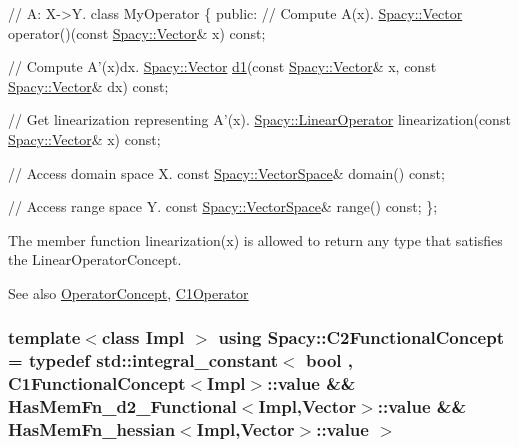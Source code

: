 \begin{DoxyCode}
\textcolor{comment}{// A: X->Y.}
\textcolor{keyword}{class }MyOperator
\{
\textcolor{keyword}{public}:
  \textcolor{comment}{// Compute A(x).}
  \hyperlink{classSpacy_1_1Vector}{Spacy::Vector} operator()(\textcolor{keyword}{const} \hyperlink{classSpacy_1_1Vector}{Spacy::Vector}& x) \textcolor{keyword}{const};

  \textcolor{comment}{// Compute A'(x)dx.}
  \hyperlink{classSpacy_1_1Vector}{Spacy::Vector} \hyperlink{namespaceSpacy_ab6646eb7068eb9f1369e639cf0b620a2}{d1}(\textcolor{keyword}{const} \hyperlink{classSpacy_1_1Vector}{Spacy::Vector}& x, \textcolor{keyword}{const} 
      \hyperlink{classSpacy_1_1Vector}{Spacy::Vector}& dx) \textcolor{keyword}{const};

  \textcolor{comment}{// Get linearization representing A'(x).}
 \hyperlink{classSpacy_1_1LinearOperator}{Spacy::LinearOperator} linearization(\textcolor{keyword}{const} \hyperlink{classSpacy_1_1Vector}{Spacy::Vector}& x) \textcolor{keyword}{const};

  \textcolor{comment}{// Access domain space X.}
  \textcolor{keyword}{const} \hyperlink{classSpacy_1_1VectorSpace}{Spacy::VectorSpace}& domain() \textcolor{keyword}{const};

  \textcolor{comment}{// Access range space Y.}
  \textcolor{keyword}{const} \hyperlink{classSpacy_1_1VectorSpace}{Spacy::VectorSpace}& range() \textcolor{keyword}{const};
\};
\end{DoxyCode}


The member function {\ttfamily linearization(x)} is allowed to return any type that satisfies the Linear\+Operator\+Concept.

\begin{DoxySeeAlso}{See also}
\hyperlink{group__ConceptGroup_ga0cd6ba53feff75abbb6822b45fd6265e}{Operator\+Concept}, \hyperlink{classSpacy_1_1C1Operator}{C1\+Operator} 
\end{DoxySeeAlso}
\hypertarget{group__ConceptGroup_ga265f0821ce6e0688d6e9abb8d8e0af6a}{}
\subsubsection[{C2\+Functional\+Concept}]{\setlength{\rightskip}{0pt plus 5cm}template$<$class Impl $>$ using {\bf Spacy\+::\+C2\+Functional\+Concept} = typedef std\+::integral\+\_\+constant$<$ bool , C1\+Functional\+Concept$<$Impl$>$\+::value \&\& Has\+Mem\+Fn\+\_\+d2\+\_\+\+Functional$<$Impl,Vector$>$\+::value \&\& Has\+Mem\+Fn\+\_\+hessian$<$Impl,Vector$>$\+::value $>$}\label{group__ConceptGroup_ga265f0821ce6e0688d6e9abb8d8e0af6a}
\label{group__ConceptGroup_C2FunctionalConceptAnchor}%
\hypertarget{group__ConceptGroup_C2FunctionalConceptAnchor}{}%
 
